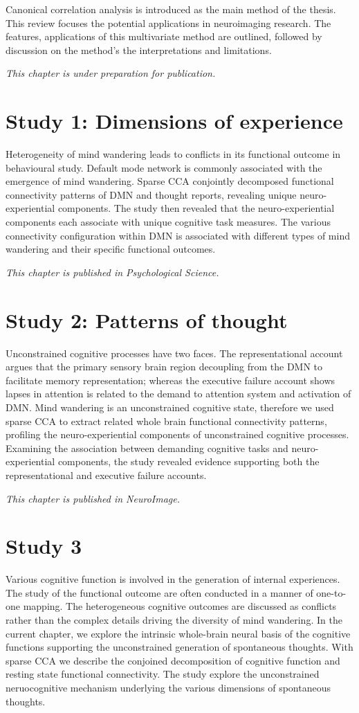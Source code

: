 Canonical correlation analysis is introduced as the main method of the thesis. This review focuses the potential applications in neuroimaging research. The features, applications of this multivariate method are outlined, followed by discussion on the method's the interpretations and limitations. 

\textit{This chapter is under preparation for publication. } 

\section*{Study 1: Dimensions of experience}
Heterogeneity of mind wandering leads to conflicts in its functional outcome in behavioural study. Default mode network is commonly associated with the emergence of mind wandering. Sparse CCA conjointly decomposed functional connectivity patterns of DMN and thought reports, revealing unique neuro-experiential components. The study then revealed that the neuro-experiential components each associate with unique cognitive task measures. The various connectivity configuration within DMN is associated with different types of mind wandering and their specific functional outcomes.

\textit{This chapter is published in Psychological Science.}

\section*{Study 2: Patterns of thought}
Unconstrained cognitive processes have two faces. The representational account argues that the primary sensory brain region decoupling from the DMN to facilitate memory representation; whereas the executive failure account shows lapses in attention is related to the demand to attention system and activation of DMN. Mind wandering is an unconstrained cognitive state, therefore we used sparse CCA to extract related whole brain functional connectivity patterns, profiling the neuro-experiential components of unconstrained cognitive processes. Examining the association between demanding cognitive tasks and neuro-experiential components, the study revealed evidence supporting both the representational and executive failure accounts.

\textit{This chapter is published in NeuroImage.}

\section*{Study 3}
Various cognitive function is involved in the generation of internal experiences. The study of the functional outcome are often conducted in a manner of one-to-one mapping. The heterogeneous cognitive outcomes are discussed as conflicts rather than the complex details driving the diversity of mind wandering. In the current chapter, we explore the intrinsic whole-brain neural basis of the cognitive functions supporting the unconstrained generation of spontaneous thoughts.  With sparse CCA we describe the conjoined decomposition of cognitive function and resting state functional connectivity. The study explore the unconstrained neruocognitive mechanism underlying the various dimensions of spontaneous thoughts.


